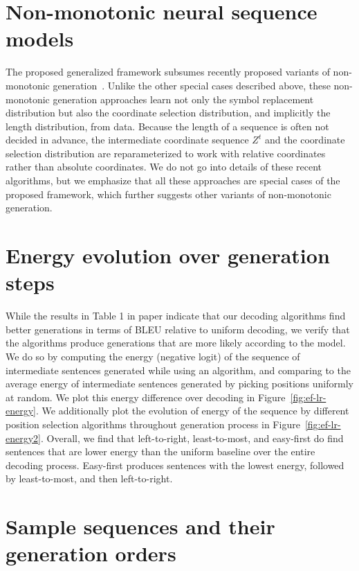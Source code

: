 \documentclass{article}
\begin{document}
\section{Non-monotonic neural sequence models}

The proposed generalized framework subsumes recently proposed variants of non-monotonic generation~\citep{welleck2019nonmonotonic,stern2019inserttransformer,gu2019insertiondecoding}. Unlike the other special cases described above, these non-monotonic generation approaches learn not only the symbol replacement distribution but also the coordinate selection distribution, and implicitly the length distribution, from data. Because the length of a sequence is often not decided in advance, the intermediate coordinate sequence $Z^t$ and the coordinate selection distribution are reparameterized to work with relative coordinates rather than absolute coordinates. We do not go into details of these recent algorithms, but we emphasize that all these approaches are special cases of the proposed framework, which further suggests other variants of non-monotonic generation. 

\section{Energy evolution over generation steps}
\label{appendix:energy}

While the results in Table 1 in paper indicate that our decoding algorithms find better generations in terms of BLEU relative to uniform decoding, we verify that the algorithms produce generations that are more likely according to the model.
We do so by computing the energy (negative logit) of the sequence of intermediate sentences generated while using an algorithm, and comparing to the average energy of intermediate sentences generated by picking positions uniformly at random.
We plot this energy difference over decoding in Figure~\ref{fig:ef-lr-energy}. We additionally plot the evolution of energy of the sequence by different position selection algorithms throughout generation process in Figure~\ref{fig:ef-lr-energy2}.
Overall, we find that left-to-right, least-to-most, and easy-first do find sentences that are lower energy than the uniform baseline over the entire decoding process.
Easy-first produces sentences with the lowest energy, followed by least-to-most, and then left-to-right. 

\section{Sample sequences and their generation orders}
\label{appendix:samples}
\end{document}
